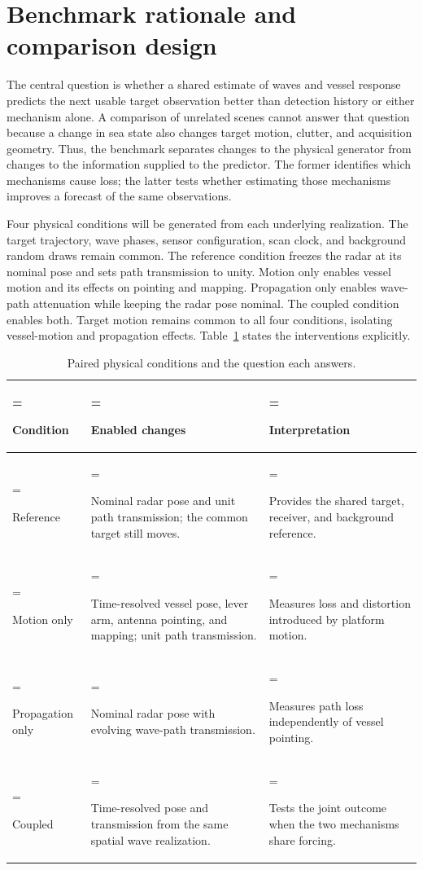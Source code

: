 \documentclass[10pt,letterpaper]{article}
\begin{document}
\clearpage

\section{Benchmark rationale and comparison design}
\label{app:benchmark}

The central question is whether a shared estimate of waves and vessel response predicts the next usable target observation better than detection history or either mechanism alone. A comparison of unrelated scenes cannot answer that question because a change in sea state also changes target motion, clutter, and acquisition geometry. Thus, the benchmark separates changes to the physical generator from changes to the information supplied to the predictor. The former identifies which mechanisms cause loss; the latter tests whether estimating those mechanisms improves a forecast of the same observations.

Four physical conditions will be generated from each underlying realization. The target trajectory, wave phases, sensor configuration, scan clock, and background random draws remain common. The reference condition freezes the radar at its nominal pose and sets path transmission to unity. Motion only enables vessel motion and its effects on pointing and mapping. Propagation only enables wave-path attenuation while keeping the radar pose nominal. The coupled condition enables both. Target motion remains common to all four conditions, isolating vessel-motion and propagation effects. Table~\ref{tab:truth-worlds} states the interventions explicitly.

\begin{table}[H]
\centering
\caption{Paired physical conditions and the question each answers.}
\label{tab:truth-worlds}
\small
\begin{tabularx}{\textwidth}{@{}>{\hsize=0.65\hsize\linewidth=\hsize\raggedright\arraybackslash}X>{\hsize=1.25\hsize\linewidth=\hsize\raggedright\arraybackslash}X>{\hsize=1.1\hsize\linewidth=\hsize\raggedright\arraybackslash}X@{}}
\toprule
Condition & Enabled changes & Interpretation \\
\midrule
Reference & Nominal radar pose and unit path transmission; the common target still moves. & Provides the shared target, receiver, and background reference. \\
Motion only & Time-resolved vessel pose, lever arm, antenna pointing, and mapping; unit path transmission. & Measures loss and distortion introduced by platform motion. \\
Propagation only & Nominal radar pose with evolving wave-path transmission. & Measures path loss independently of vessel pointing. \\
Coupled & Time-resolved pose and transmission from the same spatial wave realization. & Tests the joint outcome when the two mechanisms share forcing. \\
\bottomrule
\end{tabularx}
\end{table}
\end{document}
